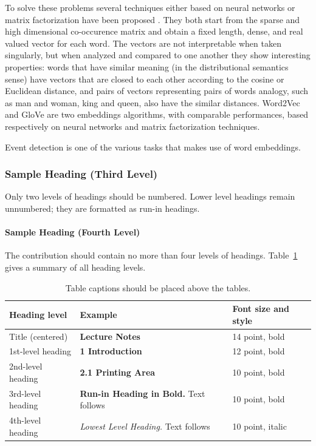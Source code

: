 \documentclass[runningheads]{llncs}
\begin{document}
To solve these problems several techniques either based on neural networks or matrix factorization have been proposed \cite{embeddings}. They both start from the sparse and high dimensional co-occurence matrix and obtain a fixed length, dense, and real valued vector for each word. The vectors are not interpretable when taken singularly, but when analyzed and compared to one another they show interesting properties: words that have similar meaning (in the distributional semantics sense) have vectors that are closed to each other according to the cosine or Euclidean distance, and pairs of vectors representing pairs of words analogy, such as man and woman, king and queen, also have the similar distances. Word2Vec \cite{wtv} and GloVe \cite{glove} are two embeddings algorithms, with comparable performances, based respectively on neural networks and matrix factorization techniques.

Event detection is one of the various tasks that makes use of word embeddings.


\subsubsection{Sample Heading (Third Level)} Only two levels of
headings should be numbered. Lower level headings remain unnumbered;
they are formatted as run-in headings.

\paragraph{Sample Heading (Fourth Level)}
The contribution should contain no more than four levels of
headings. Table~\ref{tab1} gives a summary of all heading levels.

\begin{table}
\caption{Table captions should be placed above the
tables.}\label{tab1}
\begin{tabular}{|l|l|l|}
\hline
Heading level &  Example & Font size and style\\
\hline
Title (centered) &  {\Large\bfseries Lecture Notes} & 14 point, bold\\
1st-level heading &  {\large\bfseries 1 Introduction} & 12 point, bold\\
2nd-level heading & {\bfseries 2.1 Printing Area} & 10 point, bold\\
3rd-level heading & {\bfseries Run-in Heading in Bold.} Text follows & 10 point, bold\\
4th-level heading & {\itshape Lowest Level Heading.} Text follows & 10 point, italic\\
\hline
\end{tabular}
\end{table}
\end{document}

